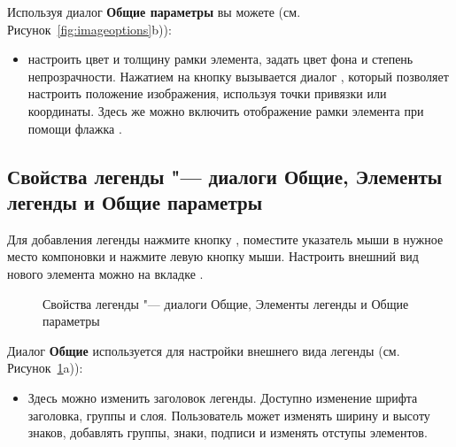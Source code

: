 
Используя диалог \textbf{Общие параметры} вы можете
(см. Рисунок~\ref{fig:imageoptions}b)):

\begin{itemize}[label=--]
\item настроить цвет и толщину рамки элемента, задать
цвет фона и степень непрозрачности. Нажатием на кнопку 
вызывается диалог , который позволяет
настроить положение изображения, используя точки привязки или координаты.
Здесь же можно включить отображение рамки элемента при помощи флажка
.
\end{itemize}

\subsection{Свойства легенды "--- диалоги Общие, Элементы легенды и Общие параметры}

Для добавления легенды нажмите кнопку
, поместите указатель
мыши в нужное место компоновки и нажмите левую кнопку мыши. Настроить
внешний вид нового элемента можно на вкладке .

\begin{figure}[h]
\centering
   \hspace{1cm}
   \hspace{1cm}
   \caption{Свойства легенды "--- диалоги Общие, Элементы легенды и Общие параметры \wincaption}\label{fig:legendoptions}
\end{figure}


Диалог \textbf{Общие} используется для настройки внешнего вида
легенды (см. Рисунок~\ref{fig:legendoptions}a)):

\begin{itemize}[label=--]
\item Здесь можно изменить заголовок легенды. Доступно изменение шрифта
заголовка, группы и слоя. Пользователь может изменять ширину и высоту
знаков, добавлять группы, знаки, подписи и изменять отступы элементов.
\end{itemize}

